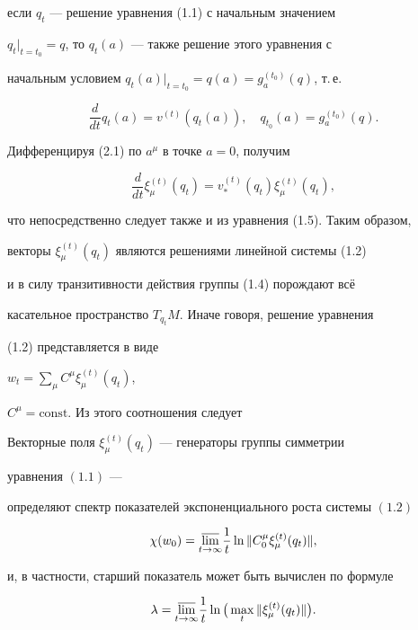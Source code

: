если $q_t$ --- решение уравнения (1.1) с начальным значением 


$q_t|_{t=t_0}=q$, то $q_t(a)$ --- также решение этого уравнения с 


начальным условием $q_t(a)|_{t=t_0}=q(a)=g^{(t_0)}_a(q)$, т.\,е. 


\begin{equation} 


\frac{d}{d t}q_t(a)=v^{(t)}(q_t(a)),\quad 


q_{t_0}(a)=g^{(t_0)}_a(q). 


\end{equation} 


Дифференцируя (2.1) по $a^\mu$ в точке $a=0$, получим 


\begin{equation} 


\frac{d}{d t}\xi^{(t)}_\mu(q_t)=v^{(t)}_*(q_t) 


\xi^{(t)}_\mu(q_t), 


\end{equation} 


что непосредственно следует также и из уравнения (1.5). Таким образом, 


векторы $\xi^{(t)}_\mu(q_t)$ являются решениями линейной системы (1.2) 


и в силу транзитивности действия группы (1.4) порождают вс\"е{}


касательное пространство $T_{q_t}M$. Иначе говоря, решение уравнения 


(1.2) представляется в виде


$w_t=\sum\limits_\mu C^\mu\xi^{(t)}_\mu(q_t)$,


$C^\mu=\text{const}$. Из этого соотношения следует 


 


\begin{thm} 


Векторные поля $\xi^{(t)}_\mu(q_t)$ --- генераторы группы симметрии 


уравнения $(1.1)$ --- 


определяют спектр показателей экспоненциального роста системы $(1.2)$ 


$$ 


\chi(w_0)=\mylim\frac{1}{t}\ln\|C^\mu_0\xi^{(t)}_\mu(q_t)\|, 


$$ 


и, в частности, старший показатель может быть вычислен по формуле 


$$ 


\lambda=\mylim\frac{1}{t}\ln\big(\max_t\|\xi^{(t)}_\mu(q_t)\|\big). 


$$ 


\end{thm} 


